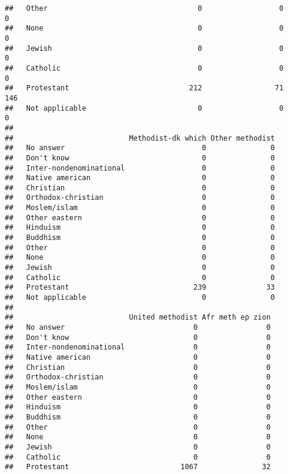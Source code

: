 \documentclass[]{article}
\theoremstyle{definition}
\theoremstyle{definition}
\theoremstyle{definition}
\theoremstyle{remark}
\begin{document}
\begin{verbatim}
##   Other                                   0                  0           0
##   None                                    0                  0           0
##   Jewish                                  0                  0           0
##   Catholic                                0                  0           0
##   Protestant                            212                 71         146
##   Not applicable                          0                  0           0
##                          
##                           Methodist-dk which Other methodist
##   No answer                                0               0
##   Don't know                               0               0
##   Inter-nondenominational                  0               0
##   Native american                          0               0
##   Christian                                0               0
##   Orthodox-christian                       0               0
##   Moslem/islam                             0               0
##   Other eastern                            0               0
##   Hinduism                                 0               0
##   Buddhism                                 0               0
##   Other                                    0               0
##   None                                     0               0
##   Jewish                                   0               0
##   Catholic                                 0               0
##   Protestant                             239              33
##   Not applicable                           0               0
##                          
##                           United methodist Afr meth ep zion
##   No answer                              0                0
##   Don't know                             0                0
##   Inter-nondenominational                0                0
##   Native american                        0                0
##   Christian                              0                0
##   Orthodox-christian                     0                0
##   Moslem/islam                           0                0
##   Other eastern                          0                0
##   Hinduism                               0                0
##   Buddhism                               0                0
##   Other                                  0                0
##   None                                   0                0
##   Jewish                                 0                0
##   Catholic                               0                0
##   Protestant                          1067               32

\end{verbatim}
\end{document}
